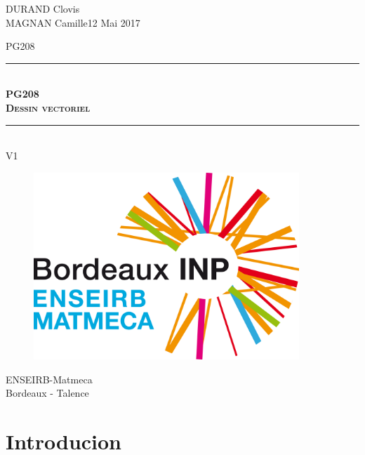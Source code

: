 \documentclass[11pt]{article}
\newcommand{\HRule}{\rule{\linewidth}{0.5mm}}
\begin{document}
\noindent 
DURAND Clovis \\ MAGNAN Camille\hfill{12 Mai 2017}



\vspace{2cm}
\begin{center}
    \Large{PG208} %
    \HRule \\[0.1cm]
    {\textsc{\LARGE \textbf{PG208 \\ Dessin vectoriel}}}\\
    \HRule\\[02cm]
    \Large{V1}
\end{center}
\vspace{1,5cm}

\begin{figure}[htbp]
    \begin{center}
        \includegraphics[width=10cm]{Logo-quadri.png}
    \end{center}
\end{figure}

\vspace{1cm}
\begin{center}
    \Large{ENSEIRB-Matmeca \\ Bordeaux - Talence}
\end{center}

\vspace{2cm}

\newpage
\tableofcontents
\listoffigures
\newpage 


\section{Introducion}
\end{document}
